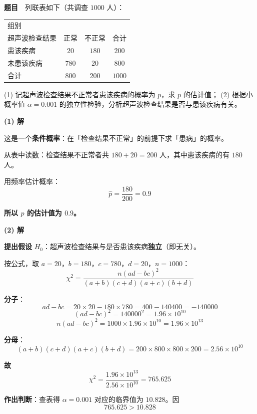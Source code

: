 \par\medskip



\textbf{题目}　列联表如下（共调查 $1000$ 人）：

\begin{center}
\begin{tabular}{lccc}
\toprule
组别 \\ 超声波检查结果 & 正常 & 不正常 & 合计 \\
\midrule
患该疾病 & $20$ & $180$ & $200$ \\
未患该疾病 & $780$ & $20$ & $800$ \\
合计 & $800$ & $200$ & $1000$ \\
\bottomrule
\end{tabular}
\end{center}

  (1) 记超声波检查结果不正常者患该疾病的概率为 $p$，求 $p$ 的估计值；
  (2) 根据小概率值 $\alpha=0.001$ 的独立性检验，分析超声波检查结果是否与患该疾病有关。

\par\medskip

\textbf{(1) 解}

这是一个\textbf{条件概率}：在「检查结果不正常」的前提下求「患病」的概率。

从表中读数：检查结果不正常者共 $180+20=200$ 人，其中患该疾病的有 $180$ 人。

用频率估计概率：
\[\hat p=\frac{180}{200}=0.9\]

\textbf{所以 $p$ 的估计值为 $0.9$。}

\par\medskip

\textbf{(2) 解}

\textbf{提出假设} $H_0$：超声波检查结果与是否患该疾病\textbf{独立}（即无关）。

按公式，取 $a=20$，$b=180$，$c=780$，$d=20$，$n=1000$：
\[\chi^2=\frac{n(ad-bc)^2}{(a+b)(c+d)(a+c)(b+d)}\]

\textbf{分子}：
\[ad-bc=20\times20-180\times780=400-140400=-140000\]
\[(ad-bc)^2=140000^2=1.96\times10^{10}\]
\[n(ad-bc)^2=1000\times1.96\times10^{10}=1.96\times10^{13}\]

\textbf{分母}：
\[(a+b)(c+d)(a+c)(b+d)=200\times800\times800\times200=2.56\times10^{10}\]

\textbf{故}
\[\chi^2=\frac{1.96\times10^{13}}{2.56\times10^{10}}=765.625\]

\textbf{作出判断}：查表得 $\alpha=0.001$ 对应的临界值为 $10.828$。因
\[765.625>10.828\]

